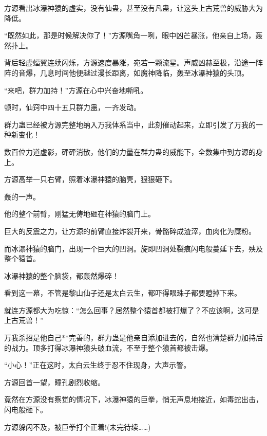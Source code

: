 \begin{this_body}
方源看出冰瀑神猿的虚实，没有仙蛊，甚至没有凡蛊，让这头上古荒兽的威胁大为降低。

“既然如此，那是时候解决你了！”方源嘴角一咧，眼中凶芒暴涨，他亲自上场，轰然扑上。

背后轻虚蝠翼连续闪烁，方源速度暴涨，宛若一颗流星。声威凶赫至极，沿途一阵阵的音爆，几息时间他便越过漫长距离，如魔神降临，轰至冰瀑神猿的头顶。

“来吧，群力加持！”方源在心中兴奋地嘶吼。

顿时，仙窍中四十五只群力蛊，一齐发动。

群力蛊已经被方源完整地纳入万我体系当中，此刻催动起来，立即引发了万我的一种新变化！

数百位力道虚影，砰砰消散，他们的力量在群力蛊的威能下，全数集中到方源的身上。

方源高举一只右臂，照着冰瀑神猿的脑壳，狠狠砸下。

轰的一声。

他的整个前臂，刚猛无俦地砸在神猿的脑门上。

巨大的反震之力，让方源的前臂直接炸裂开来，骨骼碎成渣滓，血肉化为糜粉。

而冰瀑神猿的脑门，出现一个巨大的凹洞。旋即凹洞处裂痕闪电般蔓延下去，殃及整个猿首。

冰瀑神猿的整个脑袋，都轰然爆碎！

看到这一幕，不管是黎山仙子还是太白云生，都吓得眼珠子都要瞪掉下来。

就连方源都大为吃惊：“怎么回事？居然整个猿首都被打爆了？不应该啊，这可是上古荒兽！”

万我杀招是他自己**完善的，群力蛊是他亲自添加进去的，自然也清楚群力加持后的战力。顶多打得冰瀑神猿头破血流，不至于整个猿首都被击爆。

“小心！”正在这时，太白云生终于忍不住现身，大声示警。

方源回首一望，瞳孔剧烈收缩。

竟然在方源没有察觉的情况下，冰瀑神猿的巨拳，悄无声息地接近，如毒蛇出击，闪电般砸下。

方源躲闪不及，被巨拳打个正着!(未完待续……)

\end{this_body}


